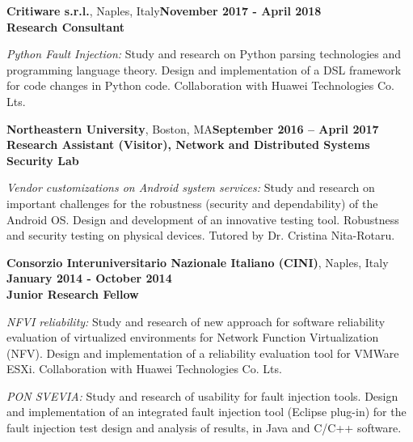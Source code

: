 \documentclass[margin,line]{resume}
\begin{document}
\begin{resume}
\textbf{Critiware s.r.l.}, Naples, Italy\hfill\textbf{November 2017 - April 2018}\\
\textbf{Research Consultant}\hfill 
\vspace{-3mm}\\\vspace{-1mm}
\begin{list2}
	\item \filbreak\textit{Python Fault Injection:} Study and research on Python parsing technologies and programming language theory. Design and implementation of a DSL framework for code changes in Python code. Collaboration with Huawei Technologies Co. Lts.
\end{list2}

\textbf{Northeastern University}, Boston, MA\hfill\textbf{September 2016 -- April 2017}\\
\textbf{Research Assistant (Visitor), Network and Distributed Systems Security Lab}\hfill 
\vspace{-3mm}\\\vspace{-1mm}
\begin{list2}
	\item \filbreak\textit{Vendor customizations on Android system services:} Study and research on important challenges for the robustness (security and dependability) of the Android OS. Design and development of an innovative testing tool. Robustness and security testing on physical devices. Tutored by Dr. Cristina Nita-Rotaru.
\end{list2}

\textbf{Consorzio Interuniversitario Nazionale Italiano (CINI)}, Naples, Italy\\
\null\hfill\textbf{January 2014 - October 2014}\\
\textbf{Junior Research Fellow}\hfill 
\vspace{-3mm}\\\vspace{-1mm}
\begin{list2}
	\item \filbreak\textit{NFVI reliability:} Study and research of new approach for software reliability evaluation of virtualized environments for Network Function Virtualization (NFV). Design and implementation of a reliability evaluation tool for VMWare ESXi. Collaboration with Huawei Technologies Co. Lts.
	\item \filbreak\textit{PON SVEVIA:} Study and research of usability for fault injection tools. Design and implementation of an integrated fault injection tool (Eclipse plug-in) for the fault injection test design and analysis of results, in Java and C/C++ software.
\end{list2}



\end{resume}
\end{document}
